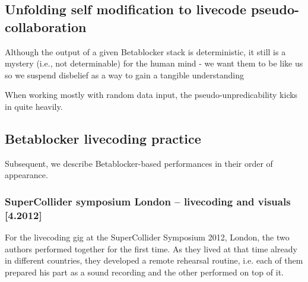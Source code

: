 \documentclass[letterpaper, 12pt]{article}
\begin{document}


\subsection{Unfolding self modification to livecode pseudo-collaboration} 
\label{sec:unfolding_self_modification_to_livecode_collaboration}

Although the output of a given Betablocker stack is deterministic, it still is a mystery (i.e., not determinable) for the human mind - we want them to be like us so we suspend disbelief as a way to gain a tangible understanding

When working mostly with random data input, the pseudo-unpredicability kicks in quite heavily. 



\subsection{Betablocker livecoding practice}
\label{sub:livecoding_performance_practice_influenced_by_betablocker}

% 
% 

Subsequent, we describe Betablocker-based performances in their order of appearance.

\subsubsection{SuperCollider symposium London -- livecoding and visuals [4.2012]}
\label{sub:livecoding_and_visuals}

For the livecoding gig at the SuperCollider Symposium 2012, London, the two authors performed together for the first time. 
As they lived at that time already in different countries, they developed a remote rehearsal routine, i.e. each of them prepared his part as a sound recording and the other performed on top of it.
\end{document}
